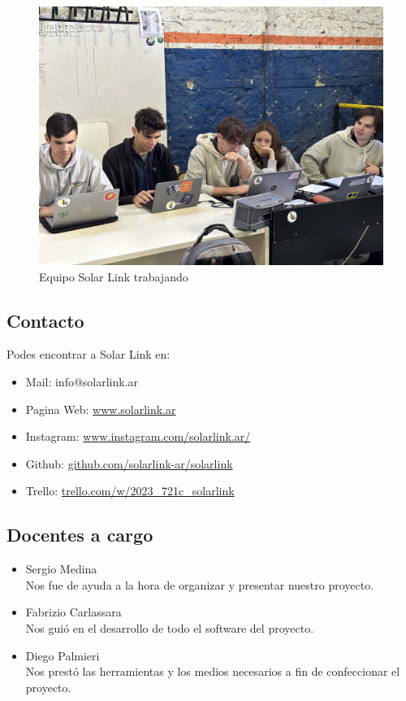 \begin{figure}[H]
    \centering
    \includegraphics[width=0.85\linewidth]{preambulo/IMG_9439.jpg}
    \caption{Equipo Solar Link trabajando}
    \label{fig:equipo solar laburando}
\end{figure}

\clearpage

\subsection{Contacto}
Podes encontrar a Solar Link en:

\begin{itemize}
\item Mail: info@solarlink.ar
\item Pagina Web: \href{https://www.solarlink.ar}{www.solarlink.ar}
\item Instagram: \href{https://www.instagram.com/solarlink.ar/}{www.instagram.com/solarlink.ar/}
\item Github: \href{https://github.com/solarlink-ar/solarlink}{github.com/solarlink-ar/solarlink}
\item Trello: \href{https://trello.com/w/2023_721c_solarlink}{trello.com/w/2023\_721c\_solarlink}
\end{itemize}

\subsection{Docentes a cargo}

\begin{itemize}
\item Sergio Medina \\ Nos fue de ayuda a la hora de organizar y presentar nuestro proyecto.
\item Fabrizio Carlassara \\ Nos guió en el desarrollo de todo el software del proyecto. 
\item Diego Palmieri \\ Nos prestó las herramientas y los medios necesarios a fin de confeccionar el proyecto.
\end{itemize}

